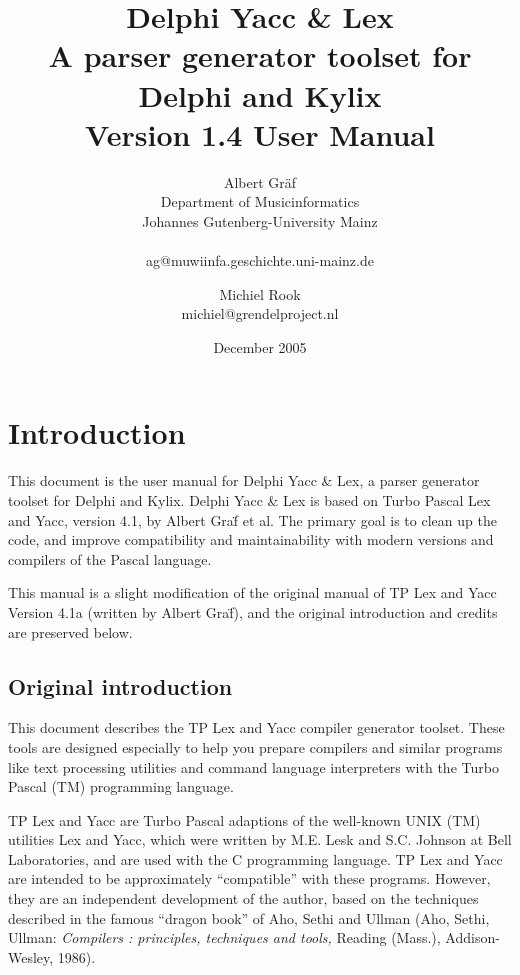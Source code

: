\documentclass[a4paper]{article}
\title{Delphi Yacc \& Lex\\A parser generator toolset for Delphi and Kylix\\
       Version 1.4 User Manual}
\author{Albert Gr\"af\\
        Department of Musicinformatics\\
        Johannes Gutenberg-University Mainz\\
        \\
        ag@muwiinfa.geschichte.uni-mainz.de}
\author{Michiel Rook\\michiel@grendelproject.nl}
\date{December 2005}
\begin{document}
\maketitle

\thispagestyle{empty}
\newpage

\pagestyle{plain}
\tableofcontents

\newpage

\pagestyle{fancy}

\section{Introduction}

This document is the user manual for Delphi Yacc \& Lex, a parser
generator toolset for Delphi and Kylix. Delphi Yacc \& Lex is based on 
Turbo Pascal Lex and Yacc, version 4.1, by Albert Gra\"f et al. 
The primary goal is to clean up the code, and improve compatibility and 
maintainability with modern versions and compilers of the Pascal language.

This manual is a slight modification of the original manual of
TP Lex and Yacc Version 4.1a (written by Albert Gra\"f), 
and the original introduction and credits are preserved below.

\subsection{Original introduction}

This document describes the TP Lex and Yacc compiler generator toolset.
These tools are designed especially to help you prepare compilers and
similar programs like text processing utilities and command language
interpreters with the Turbo Pascal (TM) programming language.

TP Lex and Yacc are Turbo Pascal adaptions of the well-known UNIX (TM)
utilities Lex and Yacc, which were written by M.E. Lesk and S.C. Johnson
at Bell Laboratories, and are used with the C programming language. TP Lex
and Yacc are intended to be approximately ``compatible'' with these programs.
However, they are an independent development of the author, based on the
techniques described in the famous ``dragon book'' of Aho, Sethi and Ullman
(Aho, Sethi, Ullman: {\em Compilers : principles, techniques and tools,\/}
Reading (Mass.), Addison-Wesley, 1986).
\end{document}
